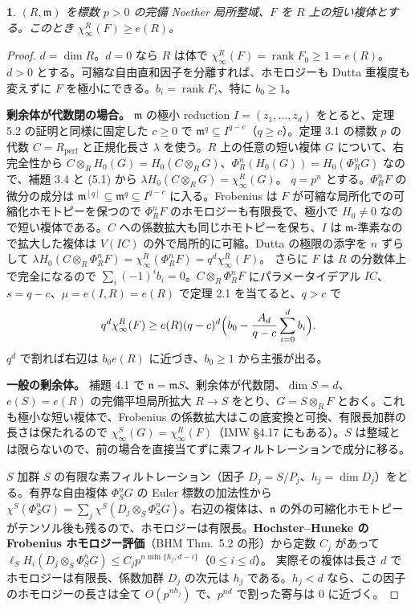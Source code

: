 \documentclass[11pt,a4paper]{ltjsarticle}
\newcommand{\stmtname}{}
\theoremstyle{plain}
\newtheorem*{stmtgen}{\stmtname}
\newenvironment{stmt}[1]{\renewcommand{\stmtname}{#1}\begin{stmtgen}}{\end{stmtgen}}
\theoremstyle{definition}
\newcommand{\m}{\mathfrak{m}}
\newcommand{\n}{\mathfrak{n}}
\newcommand{\rank}{\operatorname{rank}}
\newcommand{\perf}{\mathrm{perf}}
\begin{document}
\begin{stmt}{系 5.4（正標数の整域上の Dutta 重複度）}
$(R,\m)$ を標数 $p>0$ の完備 Noether 局所整域、$F$ を $R$ 上の短い複体とする。このとき $\chi^R_\infty(F)\ge e(R)$。
\end{stmt}
\begin{proof}
$d = \dim R$。$d = 0$ なら $R$ は体で $\chi^R_\infty(F) = \rank F_0\ge1 = e(R)$。$d>0$ とする。可縮な自由直和因子を分離すれば、ホモロジーも Dutta 重複度も変えずに $F$ を極小にできる。$b_i = \rank F_i$、特に $b_0\ge1$。

\textbf{剰余体が代数閉の場合。} $\m$ の極小 reduction $I = (z_1,\dots,z_d)$ をとると、定理 5.2 の証明と同様に固定した $c\ge0$ で $\m^q\subseteq I^{q-c}$（$q\ge c$）。定理 3.1 の標数 $p$ の代数 $C = R_\perf$ と正規化長さ $\lambda$ を使う。$R$ 上の任意の短い複体 $G$ について、右完全性から $C\otimes_RH_0(G) = H_0(C\otimes_RG)$、$\Phi^n_R(H_0(G)) = H_0(\Phi^n_RG)$ なので、補題 3.4 と (5.1) から
$\lambda H_0(C\otimes_RG) = \chi^R_\infty(G)$。
$q = p^n$ とする。$\Phi^n_RF$ の微分の成分は $\m^{[q]}\subseteq\m^q\subseteq I^{q-c}$ に入る。Frobenius は $F$ が可縮な局所化での可縮化ホモトピーを保つので $\Phi^n_RF$ のホモロジーも有限長で、極小で $H_0\ne0$ なので短い複体である。$C$ への係数拡大も同じホモトピーを保ち、$I$ は $\m$-準素なので拡大した複体は $V(IC)$ の外で局所的に可縮。Dutta の極限の添字を $n$ ずらして
$\lambda H_0(C\otimes_R\Phi^n_RF) = \chi^R_\infty(\Phi^n_RF) = q^d\chi^R_\infty(F)$。
さらに $F$ は $R$ の分数体上で完全になるので $\sum_i(-1)^ib_i = 0$。$C\otimes_R\Phi^n_RF$ にパラメータイデアル $IC$、$s = q-c$、$\mu = e(I,R) = e(R)$ で定理 2.1 を当てると、$q>c$ で
\[
  q^d\chi^R_\infty(F)\ge e(R)(q-c)^d\Bigl(b_0-\frac{A_d}{q-c}\sum_{i=0}^db_i\Bigr).
\]
$q^d$ で割れば右辺は $b_0e(R)$ に近づき、$b_0\ge1$ から主張が出る。

\textbf{一般の剰余体。} 補題 4.1 で $\n = \m S$、剰余体が代数閉、$\dim S = d$、$e(S) = e(R)$ の完備平坦局所拡大 $R\to S$ をとり、$G = S\otimes_RF$ とおく。これも極小な短い複体で、Frobenius の係数拡大はこの底変換と可換、有限長加群の長さは保たれるので $\chi^S_\infty(G) = \chi^R_\infty(F)$（IMW \S4.17 にもある）。$S$ は整域とは限らないので、前の場合を直接当てずに素フィルトレーションで成分に移る。

$S$ 加群 $S$ の有限な素フィルトレーション（因子 $D_j = S/P_j$、$h_j = \dim D_j$）をとる。有界な自由複体 $\Phi^n_SG$ の Euler 標数の加法性から $\chi^S(\Phi^n_SG) = \sum_j\chi^S(D_j\otimes_S\Phi^n_SG)$。右辺の複体は、$\n$ の外の可縮化ホモトピーがテンソル後も残るので、ホモロジーは有限長。\textbf{Hochster--Huneke の Frobenius ホモロジー評価}（BHM Thm.~5.2 の形）から定数 $C_j$ があって
$\ell_SH_i(D_j\otimes_S\Phi^n_SG)\le C_jp^{n\min\{h_j,d-i\}}$（$0\le i\le d$）。
実際その複体は長さ $d$ でホモロジーは有限長、係数加群 $D_j$ の次元は $h_j$ である。$h_j<d$ なら、この因子のホモロジーの長さは全て $O(p^{nh_j})$ で、$p^{nd}$ で割った寄与は $0$ に近づく。


\end{proof}
\end{document}
